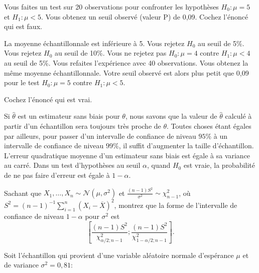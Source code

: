 \begin{questions}
\vspace{0.5cm} 

\question[3] Vous faites un test sur 20 observations  pour confronter les hypothèses $H_0: \mu=5$ et $H_1: \mu<5$. Vous obtenez un seuil observé (valeur P) de 0,09. Cochez l'énoncé qui est faux.

\begin{checkboxes}
\choice La moyenne échantillonnale est inférieure à 5.
\correctchoice Vous rejetez $H_0$ au seuil de 5\%.
\choice Vous rejetez $H_0$ au seuil de 10\%.
\choice Vous ne rejetez pas $H_0: \mu=4$ contre $H_1: \mu<4$ au seuil de 5\%.
\choice Vous refaites l'expérience avec 40 observations. Vous obtenez la même moyenne échantillonnale. Votre seuil observé est alors plus petit que 0,09 pour le test $H_0: \mu=5$ contre $H_1: \mu<5$.
\end{checkboxes}

\vspace{0.5cm}

\question[3] Cochez l'énoncé qui est vrai.

\begin{checkboxes}
    \choice Si $\hat{\theta}$ est un estimateur sans biais pour $\theta$, nous savons que la valeur de $\hat{\theta}$ calculé à partir d'un échantillon sera toujours très proche de $\theta$.
    \choice Toutes choses étant égales par ailleurs, pour passer d'un intervalle de confiance de niveau $95\%$ à un intervalle de confiance de niveau $99\%$, il suffit d'augmenter la taille d'échantillon.
    \choice L'erreur quadratique moyenne d'un estimateur sans biais est égale à sa variance au carré.
    \correctchoice Dans un test d'hypothèses au seuil $\alpha$, quand $H_0$ est vraie, la probabilité de ne pas faire d'erreur est égale à $1-\alpha$.
\end{checkboxes}

\pageblanche

\question[10]
Sachant que $X_1,\hdots,X_n\sim\mathcal{N}(\mu,\sigma^2)$ et $\displaystyle\frac{(n-1)S^2}{\sigma^2}\sim \chi^2_{n-1}$, où $S^2=(n-1)^{-1}\sum_{i=1}^n (X_i-\overline{X})^2$, montrez que la forme de l'intervalle de confiance de niveau $1-\alpha$ pour $\sigma^2$ est $$\displaystyle\left[\frac{(n-1)S^2}{\chi^2_{\alpha/2;n-1}};\frac{(n-1)S^2}{\chi^2_{1-\alpha/2;n-1}}\right].$$

    \pageblanche

\question Soit l'échantillon qui provient d'une variable aléatoire normale d'espérance $\mu$ et de variance $\sigma^2=0,81$:


\end{questions}

